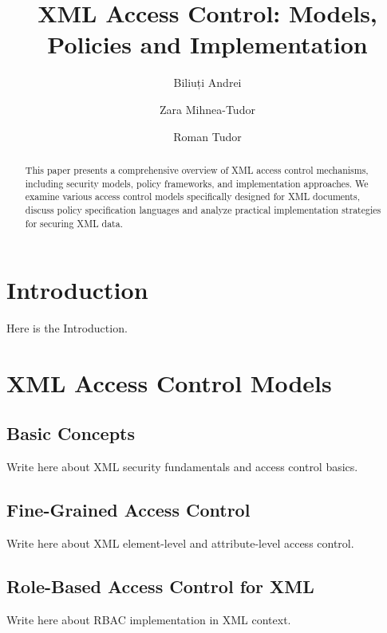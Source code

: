 \documentclass[runningheads]{llncs}
\begin{document}
\title{XML Access Control: Models, Policies and Implementation}
\author{Biliuți Andrei \and Zara Mihnea-Tudor \and Roman Tudor}
\maketitle

\begin{abstract}
This paper presents a comprehensive overview of XML access control mechanisms, including security models, policy frameworks, and implementation approaches. We examine various access control models specifically designed for XML documents, discuss policy specification languages and analyze practical implementation strategies for securing XML data.
\end{abstract}

\section{Introduction}
Here is the Introduction.

\section{XML Access Control Models}

\subsection{Basic Concepts}
Write here about XML security fundamentals and access control basics.

\subsection{Fine-Grained Access Control}
Write here about XML element-level and attribute-level access control.

\subsection{Role-Based Access Control for XML}
Write here about RBAC implementation in XML context.

\end{document}

